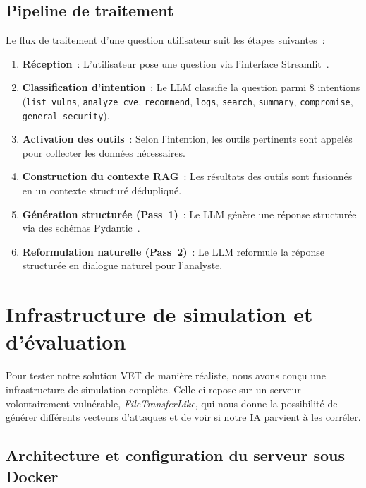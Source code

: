 \documentclass[runningheads]{llncs}
\begin{document}
\subsection{Pipeline de traitement}

Le flux de traitement d'une question utilisateur suit les étapes suivantes~:

\begin{enumerate}[nosep]
    \item \textbf{Réception}~: L'utilisateur pose une question via l'interface Streamlit~\cite{streamlit2023}.
    \item \textbf{Classification d'intention}~: Le LLM classifie la question parmi 8 intentions (\texttt{list\_vulns}, \texttt{analyze\_cve}, \texttt{recommend}, \texttt{logs}, \texttt{search}, \texttt{summary}, \texttt{compromise}, \texttt{general\_security}).
    \item \textbf{Activation des outils}~: Selon l'intention, les outils pertinents sont appelés pour collecter les données nécessaires.
    \item \textbf{Construction du contexte RAG}~: Les résultats des outils sont fusionnés en un contexte structuré dédupliqué.
    \item \textbf{Génération structurée (Pass~1)}~: Le LLM génère une réponse structurée via des schémas Pydantic~\cite{pydantic2023}.
    \item \textbf{Reformulation naturelle (Pass~2)}~: Le LLM reformule la réponse structurée en dialogue naturel pour l'analyste.
\end{enumerate}


\section{Infrastructure de simulation et d'évaluation}

Pour tester notre solution VET de manière réaliste, nous avons conçu une infrastructure de simulation complète. Celle-ci repose sur un serveur volontairement vulnérable, \textit{FileTransferLike}, qui nous donne la possibilité de générer différents vecteurs d'attaques et de voir si notre IA parvient à les corréler.

\subsection{Architecture et configuration du serveur sous Docker}
\end{document}
